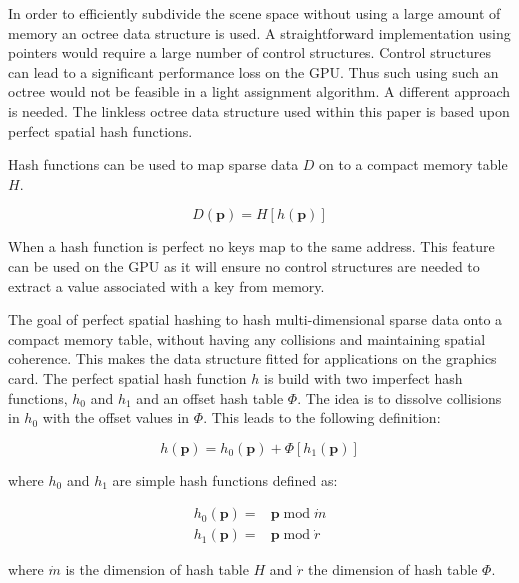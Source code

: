 In order to efficiently subdivide the scene space without using a large amount
of memory an octree data structure is used. A straightforward implementation
using pointers would require a large number of control structures. Control structures
can lead to a significant performance loss on the GPU\cite{}. Thus such using such
an octree would not be feasible in a light assignment algorithm. A different
approach is needed. The linkless octree\cite{} data structure used within this paper
is based upon perfect spatial hash functions\cite{}.

Hash functions can be used to map sparse data $D$ on to a compact memory table $H$.

\begin{equation*}
  D\left(\mathbf{p}\right) = H\left[ \mathit{h}\left(\mathbf{p} \right) \right]
\end{equation*}

\noindent When a hash function is perfect no keys map to the same address. 
This feature can be used on the GPU as it will ensure no control structures are needed to extract a
value associated with a key from memory.

The goal of perfect spatial hashing to hash multi-dimensional sparse data onto a compact
memory table, without having any collisions and maintaining spatial coherence.
This makes the data structure fitted for applications on the graphics card.
The perfect spatial hash function $\mathit{h}$ is build with two imperfect hash functions,
$\mathit{h}_0$ and $\mathit{h}_1$ and an offset hash table $\Phi$. The idea is to dissolve
collisions in $\mathit{h}_0$ with the offset values in $\Phi$. This leads to the following
definition:

\begin{equation*}
  \mathit{h}\left(\mathbf{p}\right) = \mathit{h}_0\left(\mathbf{p}\right) + \Phi\left[\mathit{h}_1\left(\mathbf{p}\right)\right]
\end{equation*}

\noindent where $\mathit{h}_0$ and $\mathit{h}_1$ are simple hash functions defined as:

\begin{align*}
  \mathit{h}_0\left(\mathbf{p}\right) =& \mathbf{p} \operatorname{mod} \dot{m} \\
  \mathit{h}_1\left(\mathbf{p}\right) =& \mathbf{p} \operatorname{mod} \dot{r}
\end{align*}

\noindent where $\dot{m}$ is the dimension of hash table $H$ and $\dot{r}$ the dimension
of hash table $\Phi$.

